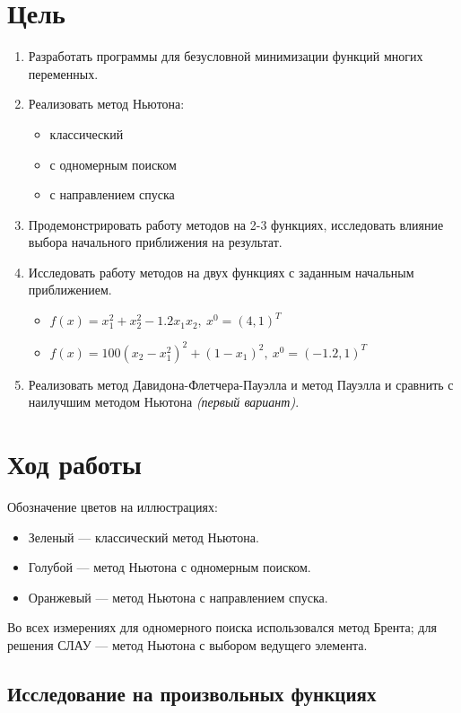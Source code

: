 \section{Цель}
\begin{enumerate}
	\item Разработать программы для безусловной минимизации функций многих переменных.
	\item Реализовать метод Ньютона:
	      \begin{itemize}
		      \item классический
		      \item с одномерным поиском
		      \item с направлением спуска
	      \end{itemize}
	\item Продемонстрировать работу методов на 2-3 функциях, исследовать влияние выбора начального приближения на результат.
	\item Исследовать работу методов на двух функциях с заданным начальным приближением.
	      \begin{itemize}
		      \item \(f(x) = x_1^2 + x_2^2 - 1.2x_1x_2,\ x^0 = (4, 1)^T\)
		      \item \(f(x) = 100(x_2 - x_1^2)^2 + (1 - x_1)^2,\ x^0 = (-1.2, 1)^T\)
	      \end{itemize}
	\item Реализовать метод Давидона-Флетчера-Пауэлла и метод Пауэлла и сравнить с наилучшим методом Ньютона \textit{(первый вариант)}.
\end{enumerate}

\section{Ход работы}

Обозначение цветов на иллюстрациях:
\begin{itemize}
	\item Зеленый --- классический метод Ньютона.
	\item Голубой --- метод Ньютона с одномерным поиском.
	\item Оранжевый --- метод Ньютона с направлением спуска.
\end{itemize}

Во всех измерениях для одномерного поиска использовался метод Брента; для решения СЛАУ --- метод Ньютона с выбором ведущего элемента.

\subsection{Исследование на произвольных функциях}


